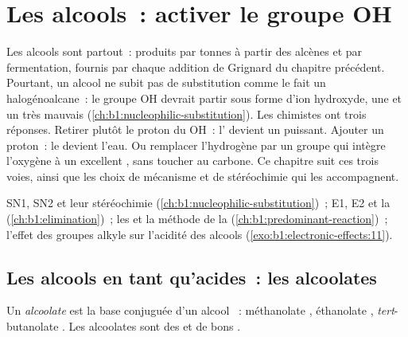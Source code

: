\chapter{Les alcools~: activer le groupe OH}\label{ch:b1:alcohol-activation}

Les alcools sont partout~: produits par tonnes à partir des alcènes et
par fermentation, fournis par chaque addition de Grignard du chapitre
précédent. Pourtant, un alcool ne subit pas de substitution comme le
fait un halogénoalcane~: le groupe OH devrait partir sous forme d'ion
hydroxyde, une  et un très mauvais 
(\cref{ch:b1:nucleophilic-substitution}). Les chimistes ont trois
réponses. Retirer plutôt le proton du OH~: l' devient un
 puissant. Ajouter un proton~: le  devient
l'eau. Ou remplacer l'hydrogène par un groupe qui intègre l'oxygène à un
excellent , sans toucher au carbone. Ce chapitre suit ces
trois voies, ainsi que les choix de mécanisme et de stéréochimie qui les
accompagnent.

\begin{recall}
SN1, SN2 et leur stéréochimie (\cref{ch:b1:nucleophilic-substitution})~;
E1, E2 et la  (\cref{ch:b1:elimination})~; les
 et la méthode de la 
(\cref{ch:b1:predominant-reaction})~; l'effet des groupes alkyle sur
l'acidité des alcools (\cref{exo:b1:electronic-effects:11}).
\end{recall}

\section{Les alcools en tant qu'acides~: les alcoolates}

\begin{definition}[Alcoolate]\label{def:b1:alcohol-activation:alkoxide}
Un \emph{alcoolate} est la base conjuguée  d'un
alcool ~: méthanolate , éthanolate ,
\textit{tert}-butanolate . Les alcoolates sont des  et de bons .
\end{definition}

